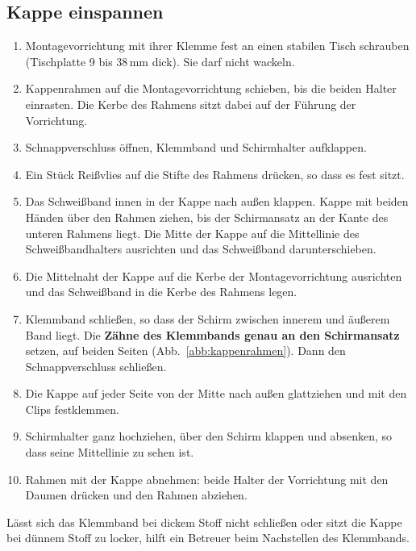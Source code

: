 \documentclass{\basedir/fablab-document}
\begin{document}
	\subsection{Kappe einspannen}
	\begin{enumerate}
		\item Montagevorrichtung mit ihrer Klemme fest an einen stabilen Tisch schrauben (Tischplatte 9 bis 38\,mm dick). Sie darf nicht wackeln.
		\item Kappenrahmen auf die Montagevorrichtung schieben, bis die beiden Halter einrasten. Die Kerbe des Rahmens sitzt dabei auf der Führung der Vorrichtung.
		\item Schnappverschluss öffnen, Klemmband und Schirmhalter aufklappen.
		\item Ein Stück Reißvlies auf die Stifte des Rahmens drücken, so dass es fest sitzt.
		\item Das Schweißband innen in der Kappe nach außen klappen. Kappe mit beiden Händen über den Rahmen ziehen, bis der Schirmansatz an der Kante des unteren Rahmens liegt. Die Mitte der Kappe auf die Mittellinie des Schweißbandhalters ausrichten und das Schweißband darunterschieben.
		\item Die Mittelnaht der Kappe auf die Kerbe der Montagevorrichtung ausrichten und das Schweißband in die Kerbe des Rahmens legen.
		\item Klemmband schließen, so dass der Schirm zwischen innerem und äußerem Band liegt. Die \textbf{Zähne des Klemmbands genau an den Schirmansatz} setzen, auf beiden Seiten (Abb.~\ref{abb:kappenrahmen}). Dann den Schnappverschluss schließen.
		\item Die Kappe auf jeder Seite von der Mitte nach außen glattziehen und mit den Clips festklemmen.
		\item Schirmhalter ganz hochziehen, über den Schirm klappen und absenken, so dass seine Mittellinie zu sehen ist.
		\item Rahmen mit der Kappe abnehmen: beide Halter der Vorrichtung mit den Daumen drücken und den Rahmen abziehen.
	\end{enumerate}
	Lässt sich das Klemmband bei dickem Stoff nicht schließen oder sitzt die Kappe bei dünnem Stoff zu locker, hilft ein Betreuer beim Nachstellen des Klemmbands.

	\begin{center}
		
		\label{abb:kappenrahmen}
	\end{center}
\end{document}
